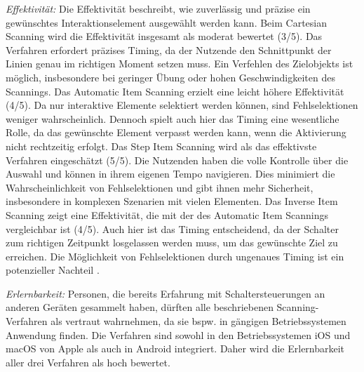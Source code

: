 \textit{Effektivität:}
Die Effektivität beschreibt, wie zuverlässig und präzise ein gewünschtes Interaktionselement ausgewählt werden kann. Beim Cartesian Scanning wird die Effektivität insgesamt als moderat bewertet (3/5). Das Verfahren erfordert präzises Timing, da der Nutzende den Schnittpunkt der Linien genau im richtigen Moment setzen muss. Ein Verfehlen des Zielobjekts ist möglich, insbesondere bei geringer Übung oder hohen Geschwindigkeiten des Scannings. Das Automatic Item Scanning erzielt eine leicht höhere Effektivität (4/5). Da nur interaktive Elemente selektiert werden können, sind Fehlselektionen weniger wahrscheinlich. Dennoch spielt auch hier das Timing eine wesentliche Rolle, da das gewünschte Element verpasst werden kann, wenn die Aktivierung nicht rechtzeitig erfolgt. Das Step Item Scanning wird als das effektivste Verfahren eingeschätzt (5/5). Die Nutzenden haben die volle Kontrolle über die Auswahl und können in ihrem eigenen Tempo navigieren. Dies minimiert die Wahrscheinlichkeit von Fehlselektionen und gibt ihnen mehr Sicherheit, insbesondere in komplexen Szenarien mit vielen Elementen. Das Inverse Item Scanning zeigt eine Effektivität, die mit der des Automatic Item Scannings vergleichbar ist (4/5). Auch hier ist das Timing entscheidend, da der Schalter zum richtigen Zeitpunkt losgelassen werden muss, um das gewünschte Ziel zu erreichen. Die Möglichkeit von Fehlselektionen durch ungenaues Timing ist ein potenzieller Nachteil \citep{COOK2015117}.

\textit{Erlernbarkeit:}
Personen, die bereits Erfahrung mit Schaltersteuerungen an anderen Geräten gesammelt haben, dürften alle beschriebenen Scanning-Verfahren als vertraut wahrnehmen, da sie bspw. in gängigen Betriebssystemen Anwendung finden. Die Verfahren sind sowohl in den Betriebssystemen iOS und macOS von Apple \citep{apple_einfuhrung_2024} als auch in Android \citep{Google-Switch-Access} integriert. Daher wird die Erlernbarkeit aller drei Verfahren als hoch bewertet.

